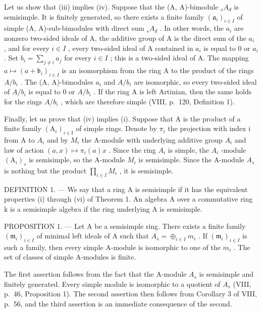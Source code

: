 Let us show that (iii) implies (iv). Suppose that the (A, A)-bimodule \(_{s}A_{d}\) is semisimple. It is finitely generated, so there exists a finite family \((\mathfrak{a}_{i})_{i\in I}\) of simple (A, A)-sub-bimodules with direct sum \(_{s}A_{d}\) . In other words, the \(a_{i}\) are nonzero two-sided ideals of A, the additive group of A is the direct sum of the \(a_{i}\) , and for every \(i\in I\) , every two-sided ideal of A contained in \(a_{i}\) is equal to 0 or \(a_{i}\) . Set \(b_{i}=\sum_{j\neq i}a_{j}\) for every \(i\in I\) ; this is a two-sided ideal of A. The mapping \(a\mapsto(a+\mathfrak{b}_{i})_{i\in I}\) is an isomorphism from the ring A to the product of the rings \(A/b_{i}\) . The (A, A)-bimodules \(a_{i}\) and \(A/b_{i}\) are isomorphic, so every two-sided ideal of \(A/b_{i}\) is equal to 0 or \(A/b_{i}\) . If the ring A is left Artinian, then the same holds for the rings \(A/b_{i}\) , which are therefore simple (VIII, p.~120, Definition 1).

Finally, let us prove that (iv) implies (i). Suppose that A is the product of a finite family \((\mathrm{A}_{i})_{i\in\mathrm{I}}\) of simple rings. Denote by \(\pi_{i}\) the projection with index i from A to \(A_{i}\) and by \(M_{i}\) the A-module with underlying additive group \(A_{i}\) and law of action \((a,x)\mapsto\pi_{i}(a)x\) . Since the ring \(A_{i}\) is simple, the \(A_{i}\) -module \((\mathrm{A}_{i})_{s}\) is semisimple, so the A-module \(M_{i}\) is semisimple. Since the A-module \(A_{s}\) is nothing but the product \(\prod_{i\in I}M_{i}\) , it is semisimple.

DEFINITION 1. --- We say that a ring A is semisimple if it has the equivalent properties (i) through (vi) of Theorem 1. An algebra A over a commutative ring k is a semisimple algebra if the ring underlying A is semisimple.

PROPOSITION 1. --- Let A be a semisimple ring. There exists a finite family \((\mathfrak{m}_{i})_{i\in I}\) of minimal left ideals of A such that \(A_{s}=\oplus_{i\in I}m_{i}\) . If \((\mathfrak{m}_{i})_{i\in I}\) is such a family, then every simple A-module is isomorphic to one of the \(m_{i}\) . The set of classes of simple A-modules is finite.

The first assertion follows from the fact that the A-module \(A_{s}\) is semisimple and finitely generated. Every simple module is isomorphic to a quotient of \(A_{s}\) (VIII, p.~46, Proposition 1). The second assertion then follows from Corollary 3 of VIII, p.~56, and the third assertion is an immediate consequence of the second.

